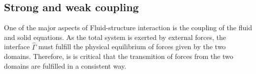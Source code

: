 \subsection*{Strong and weak coupling }
One of the major aspects of Fluid-structure interaction is the coupling of the fluid and solid equations.  As the total system is exerted by external forces, the interface $\hat{\Gamma}$ must fulfill the physical equilibrium of forces given by the two domains. Therefore, is is critical that the transmition of forces from the two domains are fulfilled in a consistent way.


